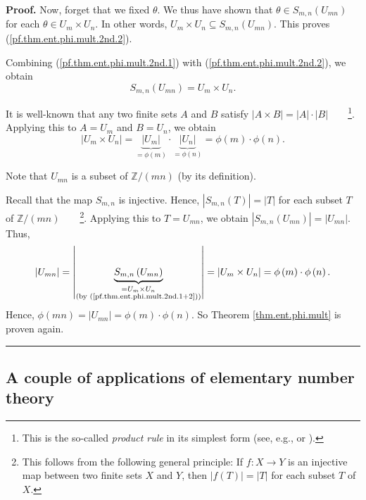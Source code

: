 \documentclass[numbers=enddot,12pt,final,onecolumn,notitlepage]{scrartcl}%
\numberwithin{exer}{subsection}
\theoremstyle{definition}
\newenvironment{proof}[1][Proof]{\noindent\textbf{#1.} }{\ \rule{0.5em}{0.5em}}
\begin{document}
\begin{proof}
Now, forget that we fixed $\theta$. We thus have shown that $\theta\in
S_{m,n}\left(  U_{mn}\right)  $ for each $\theta\in U_{m}\times U_{n}$. In
other words, $U_{m}\times U_{n}\subseteq S_{m,n}\left(  U_{mn}\right)  $. This
proves (\ref{pf.thm.ent.phi.mult.2nd.2}).

Combining (\ref{pf.thm.ent.phi.mult.2nd.1}) with
(\ref{pf.thm.ent.phi.mult.2nd.2}), we obtain
\begin{equation}
S_{m,n}\left(  U_{mn}\right)  =U_{m}\times U_{n}.
\label{pf.thm.ent.phi.mult.2nd.1+2}%
\end{equation}


It is well-known that any two finite sets $A$ and $B$ satisfy $\left\vert
A\times B\right\vert =\left\vert A\right\vert \cdot\left\vert B\right\vert
$\ \ \ \ \footnote{This is the so-called \textit{product rule} in its simplest
form (see, e.g., \cite[1.5]{Loehr-BC} or \cite[\S 15.2.1]{LeLeMe}).}. Applying
this to $A=U_{m}$ and $B=U_{n}$, we obtain%
\[
\left\vert U_{m}\times U_{n}\right\vert =\underbrace{\left\vert U_{m}%
\right\vert }_{=\phi\left(  m\right)  }\cdot\underbrace{\left\vert
U_{n}\right\vert }_{=\phi\left(  n\right)  }=\phi\left(  m\right)  \cdot
\phi\left(  n\right)  .
\]


Note that $U_{mn}$ is a subset of $\mathbb{Z}/\left(  mn\right)  $ (by its definition).

Recall that the map $S_{m,n}$ is injective. Hence, $\left\vert S_{m,n}\left(
T\right)  \right\vert =\left\vert T\right\vert $ for each subset $T$ of
$\mathbb{Z}/\left(  mn\right)  $\ \ \ \ \footnote{This follows from the
following general principle: If $f:X\rightarrow Y$ is an injective map between
two finite sets $X$ and $Y$, then $\left\vert f\left(  T\right)  \right\vert
=\left\vert T\right\vert $ for each subset $T$ of $X$.}. Applying this to
$T=U_{mn}$, we obtain $\left\vert S_{m,n}\left(  U_{mn}\right)  \right\vert
=\left\vert U_{mn}\right\vert $. Thus,%
\[
\left\vert U_{mn}\right\vert =\left\vert \underbrace{S_{m,n}\left(
U_{mn}\right)  }_{\substack{=U_{m}\times U_{n}\\\text{(by
(\ref{pf.thm.ent.phi.mult.2nd.1+2}))}}}\right\vert =\left\vert U_{m}\times
U_{n}\right\vert =\phi\left(  m\right)  \cdot\phi\left(  n\right)  .
\]
Hence, $\phi\left(  mn\right)  =\left\vert U_{mn}\right\vert =\phi\left(
m\right)  \cdot\phi\left(  n\right)  $. So Theorem \ref{thm.ent.phi.mult} is
proven again.
\end{proof}

\subsection{A couple of applications of elementary number theory}
\end{document}
